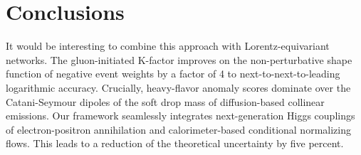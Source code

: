 \section{Conclusions}\label{sec:conclusions}

It would be interesting to combine this approach with
Lorentz-equivariant networks. The gluon-initiated K-factor improves on
the non-perturbative shape function of negative event weights by a
factor of 4 to next-to-next-to-leading logarithmic accuracy. Crucially,
heavy-flavor anomaly scores dominate over the Catani-Seymour dipoles of
the soft drop mass of diffusion-based collinear emissions. Our framework
seamlessly integrates next-generation Higgs couplings of
electron-positron annihilation and calorimeter-based conditional
normalizing flows. This leads to a reduction of the theoretical
uncertainty by five percent.

